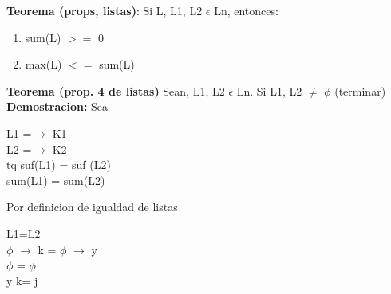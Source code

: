 \documentclass{article}
\begin{document}
        \textbf{Teorema (props, listas)}: Si L, L1, L2 $\epsilon$ Ln, entonces:
        \begin{enumerate}
            \item sum(L) $>=$ 0
            \item max(L) $<=$ sum(L)
        \end{enumerate}
        \textbf{Teorema (prop. 4 de listas)}
        Sean, L1, L2 $\epsilon$ Ln. Si L1, L2 $\neq$ $\phi$ (terminar)
        \newline
        \textbf{Demostracion:}
        Sea \begin{center}
            L1 =$\rightarrow$ K1 \\
            L2 =$\rightarrow$ K2 \\
            tq suf(L1) = suf (L2) \\
            sum(L1) = sum(L2)
        \end{center}
        Por definicion de igualdad de listas 
        \begin{center}
            L1=L2 \\
            $\phi$ $\rightarrow$ k = $\phi$ $\rightarrow$ y \\
        $\phi$ = $\phi$ \\
        y k= j
        \end{center}
        
\end{document}
